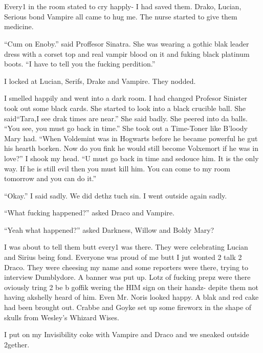 \section[vampirz wil never hurt u]{\protect{}}



Every1 in the room stated to cry happly- I had saved them. Drako, Lucian, Serious bond Vampire all came to hug me. The nurse started to give them medicine.

\enquote{Cum on Enoby.} said Proffesor Sinatra. She was wearing a gothic blak leader dress with a corset top and real vampir blood on it and fuking black platinum boots. \enquote{I have to tell you the fucking perdition.}

I locked at Lucian, Serifs, Drake and Vampire. They nodded.

I smelled happily and went into a dark room. I had changed Profesor Sinister took out some black cards. She started to look into a black crucible ball. She said\dotfill \enquote{Tara,\newline I see drak times are near.} She said badly. She peered into da balls. \enquote{You see, you must go back in time.} She took out a Time-Toner like B'loody Mary had. \enquote{When Voldemint was in Hogwarts before he became powerful he gut his hearth borken. Now do you fink he would still become Volxemort if he was in love?} I shook my head. \enquote{U must go back in time and sedouce him. It is the only way. If he is still evil then you must kill him. You can come to my room tomorrow and you can do it.}

\enquote{Okay.} I said sadly. We did dethz tuch sin. I went outside again sadly.

\enquote{What fucking happened?} asked Draco and Vampire.

\enquote{Yeah what happened?} asked Darkness, Willow and Boldy Mary?

I was about to tell them butt every1 was there. They were celebrating Lucian and Sirius being fond. Everyone was proud of me butt I jut wonted 2 talk 2 Draco. They were cheesing my name and some reporters were there, trying to interview Dumblydore. A banner was put up. Lotz of fucking prepz were there oviously tring 2 be b goffik wering the HIM sign on their handz- depite them not having akshelly heard of him. Even Mr. Noris looked happy. A blak and red cake had been brought out. Crabbe and Goyke set up some fireworx in the shape of skulls from Wesley's Whizard Wises.

I put on my Invisibility coke with Vampire and Draco and we sneaked outside 2gether.


